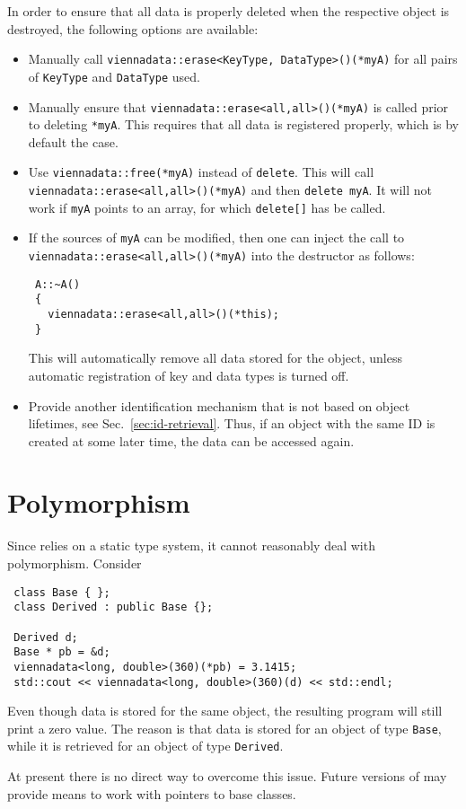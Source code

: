In order to ensure that all data is properly deleted when the respective object is destroyed, the following options are available:
\begin{itemize}
 \item Manually call \lstinline|viennadata::erase<KeyType, DataType>()(*myA)| for all pairs of \lstinline|KeyType| and \lstinline|DataType| used.
 \item Manually ensure that \lstinline|viennadata::erase<all,all>()(*myA)| is called prior to deleting \lstinline|*myA|. This requires that all data is registered properly, which is by default the case.
 \item Use \lstinline|viennadata::free(*myA)| instead of \lstinline|delete|. This will call \lstinline|viennadata::erase<all,all>()(*myA)| and then \lstinline|delete myA|. 
 It will not work if \lstinline|myA| points to an array, for which \lstinline|delete[]| has be called.
 \item If the sources of \lstinline|myA| can be modified, then one can inject the call to \lstinline|viennadata::erase<all,all>()(*myA)| into the destructor as follows:
\begin{lstlisting}
 A::~A()
 {
   viennadata::erase<all,all>()(*this);
 }
\end{lstlisting}
This will automatically remove all data stored for the object, unless automatic registration of key and data types is turned off.
 \item Provide another identification mechanism that is not based on object lifetimes, see Sec.~\ref{sec:id-retrieval}. Thus, if an object with the same ID is created at some later time, the data can be accessed again.
\end{itemize}


\section{Polymorphism}
Since {\ViennaData} relies on a static type system, it cannot reasonably deal with polymorphism. Consider
\begin{lstlisting}
 class Base { };
 class Derived : public Base {};

 Derived d;
 Base * pb = &d;
 viennadata<long, double>(360)(*pb) = 3.1415;
 std::cout << viennadata<long, double>(360)(d) << std::endl;
\end{lstlisting}
Even though data is stored for the same object, the resulting program will still print a zero value. 
The reason is that data is stored for an object of type \lstinline|Base|, while it is retrieved for an object of type \lstinline|Derived|.

At present there is no direct way to overcome this issue. Future versions of {\ViennaData} may provide means to work with pointers to base classes.



